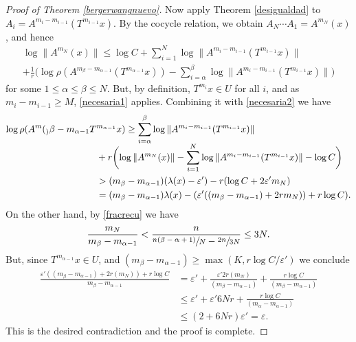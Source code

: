 \documentclass[11pt]{article}
\let\epsilon\varepsilon
\theoremstyle{plain}
\theoremstyle{definition}
\newcommand{\ccl}[3]{#1^{#2}(#3)}
\begin{document}
\begin{proof}[Proof of Theorem \ref{bergerwangnuevo}]
Now apply Theorem \ref{desigualdad} to $A_{i}=\ccl{A}{m_i-m_{i-1}}{T^{m_{i-1}}x}$. By the cocycle relation, we obtain $A_{N}\cdots A_{1}=\ccl{A}{m_N}{x}$, and hence
\begin{multline}\label{necesaria2}
\log{\|\ccl{A}{m_N}{x}\|} \leq \log{C}+\sum_{i=1}^{N}{\log{\|\ccl{A}{m_i-m_{i-1}}{T^{m_{i-1}}x}\|}} \\[-5pt]
+ \frac{1}{r}\biggl(\log{\rho(\ccl{A}{m_{\beta}-m_{\alpha-1}}{T^{m_{\alpha-1}}x})}-\sum_{i=\alpha}^{\beta}{\log{\|\ccl{A}{m_i-m_{i-1}}{T^{m_{i-1}}x}\|}}\biggr)
\end{multline}
for some $1\leq \alpha\leq \beta\leq N$. But, by definition, $T^{m_i}x\!\in\!U$ for all $i$, and as \hbox{$m_i-m_{i-1}\!\geq\!M$}, \eqref{necesaria1} applies. Combining it with \eqref{necesaria2} we have
\begin{equation*}
\begin{split}
\log\rho(\ccl{A}m_{\beta}-m_{\alpha-1}T&^{m_{\alpha-1}}x) \geq
\sum_{i=\alpha}^{\beta}{\log{\|\ccl{A}{m_i-m_{i-1}}{T^{m_{i-1}}x}\|}} \\[-5pt]
& +r\biggl( \log{\|\ccl{A}{m_N}{x}\|}-\sum_{i=1}^{N}{\log{\|\ccl{A}{m_i-m_{i-1}}{T^{m_{i-1}}x}\|}} -\log{C} \biggr)\\
& > (m_{\beta}-m_{\alpha-1})(\lambda(x)-\epsilon')-r(\log{C}+2\epsilon'm_N)\\
& = (m_{\beta}-m_{\alpha-1})\lambda(x)-( \epsilon'((m_{\beta}-m_{\alpha-1})+2rm_N))+r\log{C}).
\end{split}
\end{equation*}
On the other hand, by \eqref{fracrecu} we have
\begin{equation*}
\frac{m_N}{m_{\beta}-m_{\alpha-1}}<\frac{n}{\sfrac{n(\beta-\alpha+1)}{N}-\sfrac{2n}{3N}}\leq 3N.
\end{equation*}
But, since $T^{m_{\alpha-1}}x\in U$, and $(m_{\beta}-m_{\alpha-1})\geq \max(K,r\log{C}/\epsilon')$ we conclude
\begin{equation*}
\begin{split}
\frac{\epsilon'((m_{\beta}-m_{\alpha-1})+2r(m_N))+r\log{C} }{m_{\beta}-m_{\alpha-1}} & = \epsilon'+\frac{\epsilon'2r(m_N)}{(m_{\beta}-m_{\alpha-1})}+\frac{r\log{C}}{(m_{\beta}-m_{\alpha-1})} \\
& \leq \epsilon'+\epsilon'6Nr+\frac{r\log{C}}{(m_{\alpha}-m_{\alpha-1})}\\
& \leq (2+6Nr)\epsilon'=\epsilon.
\end{split}
\end{equation*}
This is the desired contradiction and the proof is complete.
\end{proof}
\end{document}
